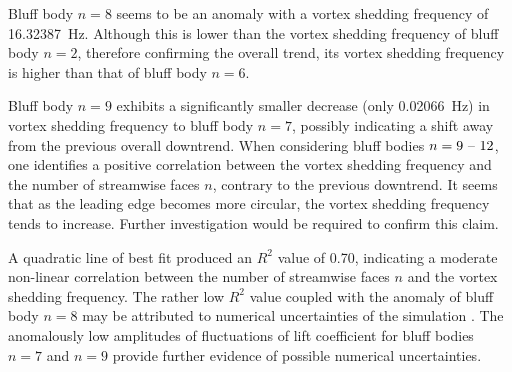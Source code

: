 Bluff body $n = 8$ seems to be an anomaly with a vortex shedding frequency of \SI{16.32387}{\hertz}. Although this is lower than the vortex shedding frequency of bluff body $n = 2$, therefore confirming the overall trend, its vortex shedding frequency is higher than that of bluff body $n = 6$. 

Bluff body $n = 9$ exhibits a significantly smaller decrease (only \SI{0.02066}{\hertz}) in vortex shedding frequency to bluff body $n = 7$, possibly indicating a shift away from the previous overall downtrend. When considering bluff bodies $n = 9 \text{ \textendash\ } 12$, one identifies a positive correlation between the vortex shedding frequency and the number of streamwise faces $n$, contrary to the previous downtrend. It seems that as the leading edge becomes more circular, the vortex shedding frequency tends to increase. Further investigation would be required to confirm this claim.

A quadratic line of best fit produced an $R^2$ value of 0.70, indicating a moderate non-linear correlation between the number of streamwise faces $n$ and the vortex shedding frequency. The rather low $R^2$ value coupled with the anomaly of bluff body $n = 8$ may be attributed to numerical uncertainties of the simulation \parencite{city7565}. The anomalously low amplitudes of fluctuations of lift coefficient for bluff bodies $n = 7$ and $n = 9$ provide further evidence of possible numerical uncertainties.



